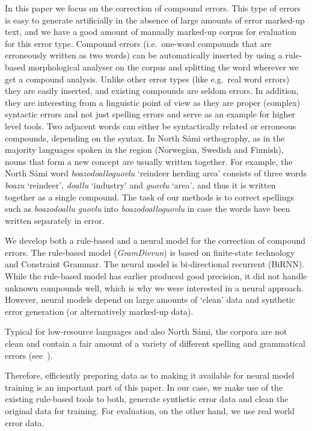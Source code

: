 \documentclass[postprint]{flammie}
\begin{document}
In this paper we focus on the correction of compound errors. This type of errors
is easy to generate artificially in the absence of large amounts of error
marked-up text, and we have a good amount of manually marked-up corpus for
evaluation for this error type.
Compound errors (i.e.\ one-word compounds that are erroneously written as two
words) can be automatically inserted by using a rule-based morphological
analyser on the corpus and splitting the word wherever we get a compound
analysis. Unlike other error types (like e.g.\ real word errors) they are easily
inserted, and existing compounds are seldom errors.  In addition, they are
interesting from a linguistic point of view as they are proper (complex)
syntactic errors and not just spelling errors and serve as an example for higher
level tools. Two adjacent words can either be syntactically related or erroneous
compounds, depending on the syntax.  In North Sámi orthography, as in the
majority languages spoken in the region (Norwegian, Swedish and Finnish), nouns
that form a new concept are usually written together. For example, the North
Sámi word \textit{boazodoalloguovlu} `reindeer herding area' consists of three
words \textit{boazu} `reindeer', \textit{doallu} `industry' and \textit{guovlu}
`area', and thus it is written together as a single compound. The task of our
methods is to correct spellings such as \textit{boazodoallu guovlu} into
\textit{boazodoalloguovlu} in case the words have been written  separately in
error.


We develop both a rule-based and a neural model for the correction of compound
errors. The rule-based model (\textit{GramDivvun})  is based on finite-state
technology and Constraint Grammar. The neural model is bi-directional recurrent
(BiRNN).  While the rule-based model has earlier produced good precision, it did
not handle unknown compounds well, which is why we were interested in a neural
approach.  However, neural models depend on  large amounts of `clean' data and
synthetic error generation (or alternatively marked-up data).


Typical for low-resource languages and also North Sámi, the corpora are not
clean and contain a fair amount of a variety of different spelling and
grammatical errors (see~\cite{antonsen2013callinmeattahusaid}).


Therefore, efficiently preparing data as to making it available for neural model
training is an important part of this paper.  In our case, we make  use of the
existing rule-based tools to both, generate synthetic error data and clean the
original data for training. For evaluation, on the other hand, we use real world
error data.
\end{document}
